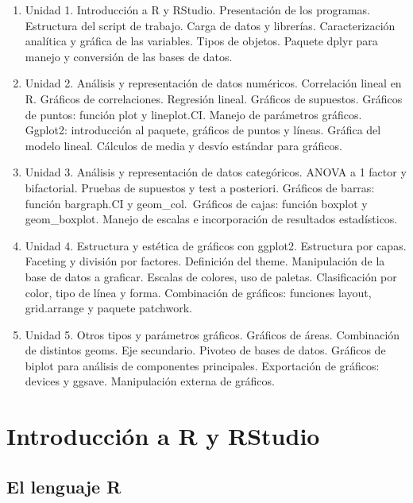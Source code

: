 \documentclass[
  letterpaper,
  DIV=11,
  numbers=noendperiod]{scrartcl}
\providecommand{\tightlist}{%
  \setlength{\itemsep}{0pt}\setlength{\parskip}{0pt}}\usepackage{longtable,booktabs,array}
\begin{document}
\begin{enumerate}
\def\labelenumi{\arabic{enumi}.}
\tightlist
\item
  Unidad 1. Introducción a R y RStudio. Presentación de los programas.
  Estructura del script de trabajo. Carga de datos y librerías.
  Caracterización analítica y gráfica de las variables. Tipos de
  objetos. Paquete dplyr para manejo y conversión de las bases de
  datos.\\
\item
  Unidad 2. Análisis y representación de datos numéricos. Correlación
  lineal en R. Gráficos de correlaciones. Regresión lineal. Gráficos de
  supuestos. Gráficos de puntos: función plot y lineplot.CI. Manejo de
  parámetros gráficos. Ggplot2: introducción al paquete, gráficos de
  puntos y líneas. Gráfica del modelo lineal. Cálculos de media y desvío
  estándar para gráficos.
\item
  Unidad 3. Análisis y representación de datos categóricos. ANOVA a 1
  factor y bifactorial. Pruebas de supuestos y test a posteriori.
  Gráficos de barras: función bargraph.CI y geom\_col.~Gráficos de
  cajas: función boxplot y geom\_boxplot. Manejo de escalas e
  incorporación de resultados estadísticos.
\item
  Unidad 4. Estructura y estética de gráficos con ggplot2. Estructura
  por capas. Faceting y división por factores. Definición del theme.
  Manipulación de la base de datos a graficar. Escalas de colores, uso
  de paletas. Clasificación por color, tipo de línea y forma.
  Combinación de gráficos: funciones layout, grid.arrange y paquete
  patchwork.
\item
  Unidad 5. Otros tipos y parámetros gráficos. Gráficos de áreas.
  Combinación de distintos geoms. Eje secundario. Pivoteo de bases de
  datos. Gráficos de biplot para análisis de componentes principales.
  Exportación de gráficos: devices y ggsave. Manipulación externa de
  gráficos.
\end{enumerate}

\hypertarget{introducciuxf3n-a-r-y-rstudio}{%
\section{Introducción a R y
RStudio}\label{introducciuxf3n-a-r-y-rstudio}}

\hypertarget{el-lenguaje-r}{%
\subsection{El lenguaje R}\label{el-lenguaje-r}}
\end{document}
